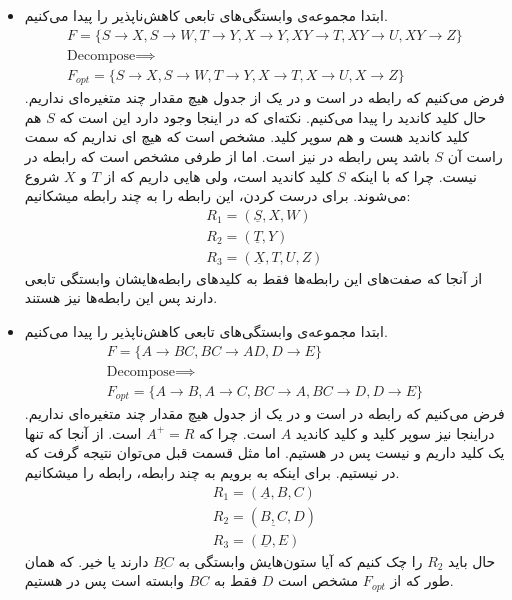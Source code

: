 \begin{itemize}
    \item ابتدا مجموعه‌ی وابستگی‌های تابعی کاهش‌ناپذیر را پیدا می‌کنیم.
    \begin{gather*}
        F = \{S \rightarrow X, S \rightarrow W, T \rightarrow Y, X \rightarrow Y, XY \rightarrow T, XY \rightarrow U, XY \rightarrow Z \}\\
        \text{Decompose} \implies\\
        F_{opt} = \{S \rightarrow X, S \rightarrow W, T \rightarrow Y, X \rightarrow T, X \rightarrow U, X \rightarrow Z\}
    \end{gather*}
    فرض می‌کنیم که رابطه در
    است و در یک
    از جدول هیچ مقدار چند متغیره‌ای نداریم. حال کلید کاندید را پیدا می‌کنیم.
    نکته‌ای که در اینجا وجود دارد این است که
    $S$
    هم کلید کاندید هست و هم سوپر کلید. مشخص است که هیچ
    ای
    نداریم که سمت راست آن
    $S$
    باشد پس رابطه در
    نیز است.
    اما از طرفی مشخص است که رابطه در
    نیست. چرا که با اینکه
    $S$
    کلید کاندید است، ولی
    هایی
    داریم که از
    $T$ و $X$
    شروع می‌شوند. برای درست کردن، این رابطه را به چند رابطه میشکانیم:
    \begin{gather*}
        R_1=(\underline{S}, X, W)\\
        R_2=(\underline{T}, Y)\\
        R_3=(\underline{X}, T, U, Z)
    \end{gather*}
    از آنجا که صفت‌های این رابطه‌ها فقط به کلید‌های رابطه‌هایشان وابستگی تابعی دارند پس این رابطه‌ها
    نیز هستند.
    \item ابتدا مجموعه‌ی وابستگی‌های تابعی کاهش‌ناپذیر را پیدا می‌کنیم.
    \begin{gather*}
        F = \{A \rightarrow BC, BC \rightarrow AD, D \rightarrow E \}\\
        \text{Decompose} \implies\\
        F_{opt} = \{A \rightarrow B, A \rightarrow C, BC \rightarrow A, BC \rightarrow D, D \rightarrow E \}
    \end{gather*}
    فرض می‌کنیم که رابطه در
    است و در یک
    از جدول هیچ مقدار چند متغیره‌ای نداریم. دراینجا نیز سوپر کلید و کلید کاندید
    $A$
    است. چرا که
    $A^+ = R$
    است. از آنجا که تنها یک کلید داریم و
    نیست پس در
    هستیم. اما مثل قسمت قبل می‌توان نتیجه گرفت که در
    نیستیم. برای اینکه به
    برویم به چند رابطه، رابطه را میشکانیم.
    \begin{gather*}
        R_1=(\underline{A}, B, C)\\
        R_2=(\underline{B, C}, D)\\
        R_3=(\underline{D}, E)
    \end{gather*}
    حال باید
    $R_2$
    را چک کنیم که آیا ستون‌هایش وابستگی به
    $\underline{BC}$
    دارند یا خیر. که همان طور که از
    $F_{opt}$
    مشخص است
    $D$
    فقط به
    $BC$
    وابسته است پس در
    هستیم.
\end{itemize}
